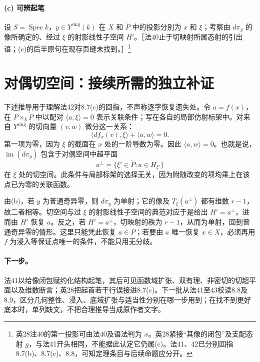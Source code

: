 \documentclass[openany,fontset=fandol]{ctexbook}
\newcommand{\Ysing}{Y^{\mathrm{sing}}}
\newcommand{\Pdual}{\check P}
\begin{document}
\paragraph{(c) 可辨起笔}
设 $S=\operatorname{Spec} k$，$y\in\Ysing(k)$ 在 $X$ 和 $\Pdual$ 中的投影分别为 $x$ 和 $\xi$；考察由 $d\pi_y$ 的像所确定的、经过 $\xi$ 的射影线性子空间 $H'$。［法40止于切映射所属态射的引出语；(c)的后半原句在现存页缝未找到。］\footnote{英28注40的第一投影可由法40及语法判为 $x$。英28紧接“其像的闭包”及支配态射 $g$，与法41开头相同，不能据此认定它仍属(c)。法41、42已分别回指8.7(b)、8.7(c)、8.8，可知定理条目与后续命题应分开。}

\newpage
\section*{对偶切空间：接续所需的独立补证}
下述推导用于理解法42对8.7(c)的回指，不声称逐字恢复遗失处。令 $a=f(x)$，在 $P\times_k\Pdual$ 中以配对 $\langle a,\xi\rangle=0$ 表示关联条件；写在各自的局部仿射标架中。对来自 $\Ysing$ 的切向量 $(v,w)$ 微分这一关系：
\[
 \langle df_x(v),\xi\rangle+\langle a,w\rangle=0.
\]
第一项为零，因为 $\xi$ 的截面在 $x$ 处的一阶导数为零。因此 $\langle a,w\rangle=0$。也就是说，$\operatorname{im}(d\pi_y)$ 包含于对偶空间中超平面
\[
 a^\perp=\{\xi'\in\Pdual : a\in H_{\xi'}\}
\]
在 $\xi$ 处的切空间。此条件与局部标架的选择无关，因为附随改变的项均乘上在该点已为零的关联函数。

由(b)，若 $y$ 为普通奇异零，则 $d\pi_y$ 为单射；它的像及 $T_\xi(a^\perp)$ 都有维数 $r-1$，故二者相等。切空间与过 $\xi$ 的射影线性子空间的典范对应于是给出 $H'=a^\perp$，进而由 $H'$ 恢复 $a$。反之，若 $H'=a^\perp$，切映射的秩为 $r-1$，从而为单射，回到普通奇异零的情形。这里只能凭此恢复 $a\in P$；若要由 $a$ 唯一恢复 $x\in X$，必须再用 $f$ 为浸入等保证点唯一的条件，不能只用无分歧。

\paragraph{下一步。}
法41以给像闭包赋约化结构起笔，其后可见函数域扩张、双有理、非密切的切超平面以及维数断言；英28把起首若干行误接进8.7(c)。下一批从法41至43校读8.8及8.9，区分几何整性、浸入、底域扩张与适当性分别在哪一步用到；在找不到更好底本时，单列缺文，不把合理推导当成原作者文字。
\end{document}
